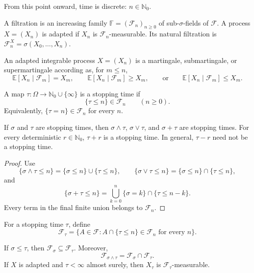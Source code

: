 From this point onward, time is discrete: $n\in\mathbb N_0$.

\begin{de}
A filtration is an increasing family
$\mathbb F=(\mathcal F_n)_{n\geq0}$ of sub-$\sigma$-fields of $\mathcal F$.
A process $X=(X_n)$ is adapted if $X_n$ is $\mathcal F_n$-measurable. Its
natural filtration is
$\mathcal F_n^X=\sigma(X_0,\ldots,X_n)$.
\end{de}

\begin{de}[Martingales]
An adapted integrable process $X=(X_n)$ is a martingale, submartingale, or
supermartingale according as, for $m\leq n$,
\[
\mathbb E[X_n\mid\mathcal F_m]
 =X_m,
\qquad
\mathbb E[X_n\mid\mathcal F_m]
 \geq X_m,
\qquad\text{or}\qquad
\mathbb E[X_n\mid\mathcal F_m]
 \leq X_m.
\]
\end{de}

\begin{de}
A map $\tau:\Omega\to\mathbb N_0\cup\{\infty\}$ is a stopping time if
\[
\{\tau\leq n\}\in\mathcal F_n
\qquad(n\geq0).
\]
Equivalently, $\{\tau=n\}\in\mathcal F_n$ for every $n$.
\end{de}

\begin{prop}
If $\sigma$ and $\tau$ are stopping times, then
$\sigma\wedge\tau$, $\sigma\vee\tau$, and $\sigma+\tau$ are stopping times.
For every deterministic $r\in\mathbb N_0$, $\tau+r$ is a stopping time.
In general, $\tau-r$ need not be a stopping time.
\end{prop}

\begin{proof}
Use
\[
\{\sigma\wedge\tau\leq n\}
 =\{\sigma\leq n\}\cup\{\tau\leq n\},
\qquad
\{\sigma\vee\tau\leq n\}
 =\{\sigma\leq n\}\cap\{\tau\leq n\},
\]
and
\[
\{\sigma+\tau\leq n\}
 =\bigcup_{k=0}^{n}\{\sigma=k\}\cap\{\tau\leq n-k\}.
\]
Every term in the final finite union belongs to $\mathcal F_n$.
\end{proof}

\begin{de}
For a stopping time $\tau$, define
\[
\mathcal F_\tau
 =\{A\in\mathcal F:A\cap\{\tau\leq n\}\in\mathcal F_n
   \text{ for every }n\}.
\]
\end{de}

\begin{prop}
If $\sigma\leq\tau$, then
$\mathcal F_\sigma\subseteq\mathcal F_\tau$. Moreover,
\[
\mathcal F_{\sigma\wedge\tau}
 =\mathcal F_\sigma\cap\mathcal F_\tau.
\]
If $X$ is adapted and $\tau<\infty$ almost surely, then
$X_\tau$ is $\mathcal F_\tau$-measurable.
\end{prop}

